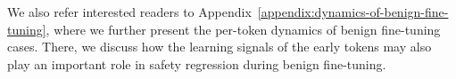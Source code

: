 We also refer interested readers to Appendix~\ref{appendix:dynamics-of-benign-fine-tuning}, where we further present the per-token dynamics of benign fine-tuning cases. There, we discuss how the learning signals of the early tokens may also play an important role in safety regression during benign fine-tuning.


 
 

 
 

 


